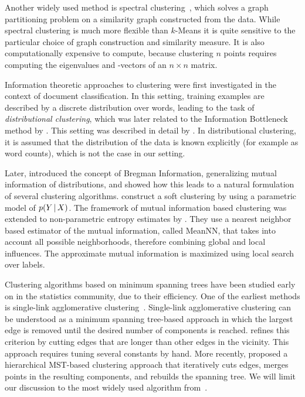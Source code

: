 Another widely used method is spectral clustering~\citep{shi2000normalized,ng2002spectral}, 
which solves a graph partitioning problem on a similarity
graph constructed from the data. While spectral clustering is much more
flexible than $k$-Means it is quite sensitive to the particular choice of graph
construction and similarity measure. It is also computationally expensive to
compute, because clustering $n$ points requires computing the eigenvalues and
-vectors of an $n\times n$ matrix.

Information theoretic approaches to clustering were first investigated in the
context of document classification. In this setting, training examples are
described by a discrete distribution over words, leading to the task of
\emph{distributional clustering}, which was later related to the Information
Bottleneck method by \citep{slonim1999agglomerative}.
This setting was described in detail by \citep{dhillon2003divisive}. In
distributional clustering, it is assumed that the distribution of the data is
known explicitly (for example as word counts), which is not the case in our
setting.

Later, \citet{banerjee2005clustering} introduced the concept of Bregman
Information, generalizing mutual information of distributions, and showed how
this leads to a natural formulation of several clustering algorithms.
%
\citet{barber2006kernelized} construct a soft clustering by using a parametric model of $p(Y\, | \, X)$.
%
The framework of mutual information based clustering was extended to
non-parametric entropy estimates by \citet{faivishevsky2010nonparametric}.
They use a nearest neighbor based estimator of the mutual information, called
MeanNN, that takes into account all possible neighborhoods, therefore combining
global and local influences. The approximate mutual information is maximized
using local search over labels.

Clustering algorithms based on minimum spanning trees have been studied early
on in the statistics community, due to their efficiency.  One of the earliest
methods is single-link agglomerative clustering~\citep{gower1969minimum}.
Single-link agglomerative clustering can be understood as a minimum spanning
tree-based approach in which the largest edge is removed until the desired
number of components is reached.  \citet{zahn1971graph} refines this criterion
by cutting edges that are longer than other edges in the vicinity. This
approach requires tuning several constants by hand. More recently,
\citet{grygorash2006minimum} proposed a hierarchical MST-based clustering
approach that iteratively cuts edges, merges points in the resulting
components, and rebuilds the spanning tree.
We will limit our discussion to the most widely used algorithm from~\citep{gower1969minimum}.
%
